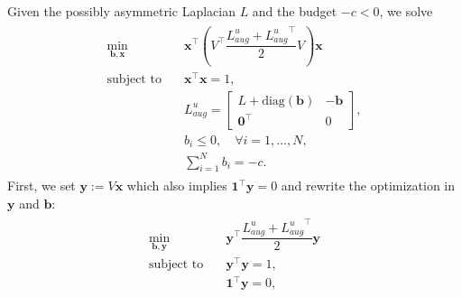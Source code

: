 \documentclass[%
 reprint,
 amsmath,amssymb,
 aip,
]{revtex4-2}
\def \bx {\pmb{x}}
\def \by {\pmb{y}}
\def \bb {\pmb{b}}
\def \bone {\pmb{1}}
\def \diag {\text{diag}}
\theoremstyle{italichead}
\theoremstyle{definition}
\begin{document}
{Given the possibly asymmetric Laplacian $L$ and the budget $-c < 0$, we solve
        \begin{align}
        \begin{split}
            \min_{\bb, \bx } \quad 
            & \bx^\top \left(V^\top \dfrac{{L_{aug}^u}+{L_{aug}^u}^\top}{2} V \right)\bx \\
            \text{subject to} \quad 
            & \bx^\top \bx = 1 , \\
            & L_{aug}^u = \begin{bmatrix}
                L + \text{diag}(\bb) & -\bb \\
                \pmb{0}^\top & 0
            \end{bmatrix}, \\
            & b_i \leq 0, \quad \forall i = 1, \hdots, N,\\
            & \sum_{i=1}^N b_i = -c.
        \end{split}
        \end{align}
    First, we set $\by:= V\bx$ which also implies $\bone^\top \by = 0$ and rewrite the optimization in $\by$ and $\bb$:
        \begin{align}
        \begin{split}
            \min_{\bb, \by } \quad 
            & \by^\top \dfrac{{L_{aug}^u}+{L_{aug}^u}^\top}{2} \by \\
            \text{subject to} \quad 
            & \by^\top \by = 1 , \\
            & \bone^\top \by = 0, \\

\end{split}
\end{align}}
\end{document}
